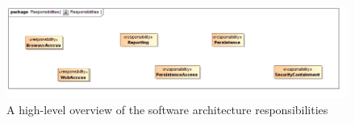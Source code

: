 \begin{figure}[H]
	\begin{center}
	\includegraphics[scale=0.4]{../Diagrams and Charts/Architecture/Responsibilities.jpg}
	\caption{A high-level overview of the software architecture responsibilities}
	\end{center}
	\label{ref:architectureResponsibilities}
\end{figure}